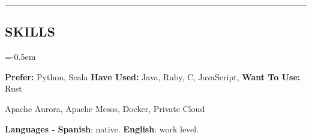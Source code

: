 \documentclass[10pt,letterpaper]{article}
\newcommand{\CPP}
{C\nolinebreak[4]\hspace{-.05em}\raisebox{.22ex}{\footnotesize\bf ++}}
\begin{document}
\hrule
\vspace{-1.0em}

\subsection*{SKILLS}
\begin{description}[labelindent=\parindent]
  \parskip=-0.5em
  \item[Languages:] \textbf{Prefer:} Python, Scala \textbf{Have Used:} Java, Ruby, \CPP, JavaScript, \textbf{Want To Use:} Rust
  \item[Systems:] Apache Aurora, Apache Mesos, Docker, Private Cloud
\end{description}

\vspace{-1.0em}
\begin{center}
	\textbf{Languages - } \textbf{Spanish}: native. \textbf{English}: work level.
\end{center}
\end{document}
